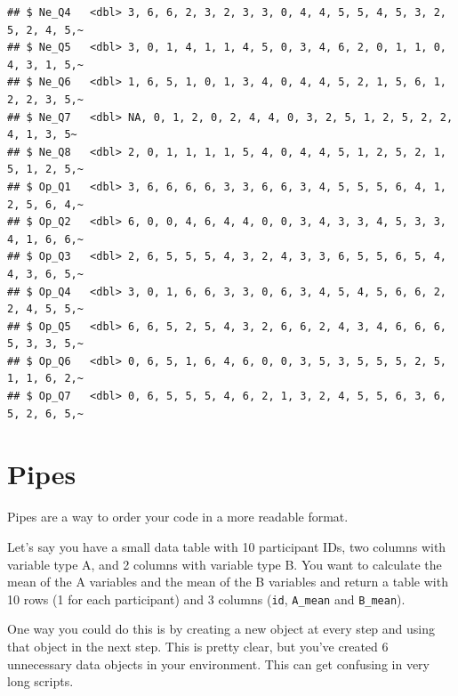 \documentclass[
  oneside]{book}
\begin{document}
\begin{verbatim}
## $ Ne_Q4   <dbl> 3, 6, 6, 2, 3, 2, 3, 3, 0, 4, 4, 5, 5, 4, 5, 3, 2, 5, 2, 4, 5,~
## $ Ne_Q5   <dbl> 3, 0, 1, 4, 1, 1, 4, 5, 0, 3, 4, 6, 2, 0, 1, 1, 0, 4, 3, 1, 5,~
## $ Ne_Q6   <dbl> 1, 6, 5, 1, 0, 1, 3, 4, 0, 4, 4, 5, 2, 1, 5, 6, 1, 2, 2, 3, 5,~
## $ Ne_Q7   <dbl> NA, 0, 1, 2, 0, 2, 4, 4, 0, 3, 2, 5, 1, 2, 5, 2, 2, 4, 1, 3, 5~
## $ Ne_Q8   <dbl> 2, 0, 1, 1, 1, 1, 5, 4, 0, 4, 4, 5, 1, 2, 5, 2, 1, 5, 1, 2, 5,~
## $ Op_Q1   <dbl> 3, 6, 6, 6, 6, 3, 3, 6, 6, 3, 4, 5, 5, 5, 6, 4, 1, 2, 5, 6, 4,~
## $ Op_Q2   <dbl> 6, 0, 0, 4, 6, 4, 4, 0, 0, 3, 4, 3, 3, 4, 5, 3, 3, 4, 1, 6, 6,~
## $ Op_Q3   <dbl> 2, 6, 5, 5, 5, 4, 3, 2, 4, 3, 3, 6, 5, 5, 6, 5, 4, 4, 3, 6, 5,~
## $ Op_Q4   <dbl> 3, 0, 1, 6, 6, 3, 3, 0, 6, 3, 4, 5, 4, 5, 6, 6, 2, 2, 4, 5, 5,~
## $ Op_Q5   <dbl> 6, 6, 5, 2, 5, 4, 3, 2, 6, 6, 2, 4, 3, 4, 6, 6, 6, 5, 3, 3, 5,~
## $ Op_Q6   <dbl> 0, 6, 5, 1, 6, 4, 6, 0, 0, 3, 5, 3, 5, 5, 5, 2, 5, 1, 1, 6, 2,~
## $ Op_Q7   <dbl> 0, 6, 5, 5, 5, 4, 6, 2, 1, 3, 2, 4, 5, 5, 6, 3, 6, 5, 2, 6, 5,~
\end{verbatim}

\hypertarget{pipes}{%
\section{Pipes}\label{pipes}}

Pipes are a way to order your code in a more readable format.

Let's say you have a small data table with 10 participant IDs, two columns with variable type A, and 2 columns with variable type B. You want to calculate the mean of the A variables and the mean of the B variables and return a table with 10 rows (1 for each participant) and 3 columns (\texttt{id}, \texttt{A\_mean} and \texttt{B\_mean}).

One way you could do this is by creating a new object at every step and using that object in the next step. This is pretty clear, but you've created 6 unnecessary data objects in your environment. This can get confusing in very long scripts.
\end{document}
